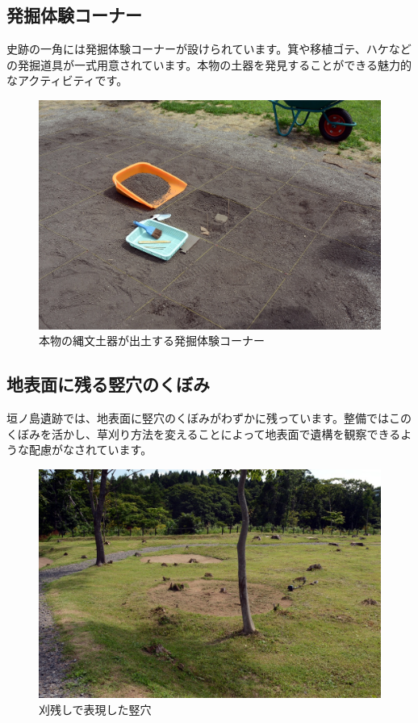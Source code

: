 \documentclass[a4j,11pt,twocolumn,openany]{jsbook}
\begin{document}
\subsection{発掘体験コーナー}

史跡の一角には発掘体験コーナーが設けられています。箕や移植ゴテ、ハケなどの発掘道具が一式用意されています。本物の土器を発見することができる魅力的なアクティビティです。

\begin{figure}[ht]
	\centering
	\includegraphics[width=\linewidth]{fig/01_Iseki_kengaku/14Hakkutu_taiken.JPG}
	\caption{本物の縄文土器が出土する発掘体験コーナー}
	\label{}
\end{figure}

\subsection{地表面に残る竪穴のくぼみ}

垣ノ島遺跡では、地表面に竪穴のくぼみがわずかに残っています。整備ではこのくぼみを活かし、草刈り方法を変えることによって地表面で遺構を観察できるような配慮がなされています。

\begin{figure}[ht]
	\centering
	\includegraphics[width=\linewidth]{fig/01_Iseki_kengaku/15Kakinosima_tateana.JPG}
	\caption{刈残しで表現した竪穴}
	\label{}
\end{figure}
\end{document}
